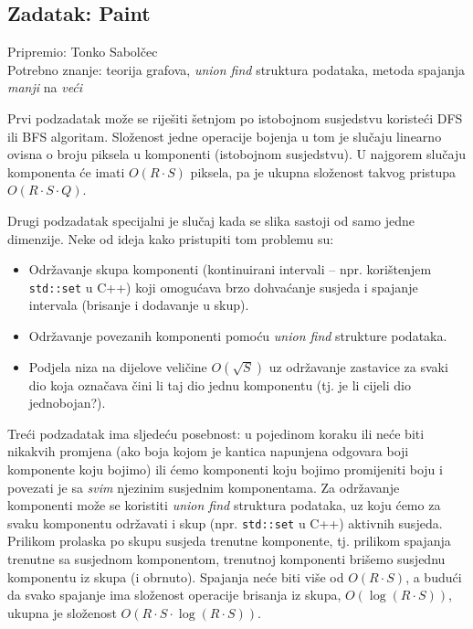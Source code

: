 \subsection*{Zadatak: Paint}
\textsf{Pripremio: Tonko Sabolčec}\\
\textsf{Potrebno znanje: teorija grafova, \textit{union find} struktura
podataka, metoda spajanja \textit{manji} na \textit{veći}}

Prvi podzadatak može se riješiti šetnjom po istobojnom susjedstvu koristeći DFS
ili BFS algoritam. Složenost jedne operacije bojenja u tom je slučaju linearno
ovisna o broju piksela u komponenti (istobojnom susjedstvu). U najgorem slučaju
komponenta će imati $O(R \cdot S)$ piksela, pa je ukupna složenost takvog
pristupa $O(R \cdot S \cdot Q)$.

Drugi podzadatak specijalni je slučaj kada se slika sastoji od samo jedne
dimenzije. Neke od ideja kako pristupiti tom problemu su:
\begin{itemize}[topsep=0pt]
  \item Održavanje skupa komponenti (kontinuirani intervali -- npr. korištenjem
    \verb|std::set| u C++) koji omogućava brzo dohvaćanje susjeda i spajanje
    intervala (brisanje i dodavanje u skup).
  \item Održavanje povezanih komponenti pomoću \textit{union find} strukture
    podataka.
  \item Podjela niza na dijelove veličine $O(\sqrt{S})$ uz održavanje
    zastavice za svaki dio koja označava čini li taj dio jednu komponentu
    (tj. je li cijeli dio jednobojan?).
\end{itemize}

Treći podzadatak ima sljedeću posebnost: u pojedinom koraku ili neće biti
nikakvih promjena (ako boja kojom je kantica napunjena odgovara boji komponente
koju bojimo) ili ćemo komponenti koju bojimo promijeniti boju i povezati je sa
\textit{svim} njezinim susjednim komponentama. Za održavanje komponenti može se
koristiti \textit{union find} struktura podataka, uz koju ćemo za svaku
komponentu održavati i skup (npr. \verb|std::set| u C++) aktivnih susjeda.
Prilikom prolaska po skupu susjeda trenutne komponente, tj. prilikom spajanja
trenutne sa susjednom komponentom, trenutnoj komponenti brišemo susjednu
komponentu iz skupa (i obrnuto).  Spajanja neće biti više od $O(R \cdot S)$, a
budući da svako spajanje ima složenost operacije brisanja iz skupa, $O(\log (R
\cdot S))$, ukupna je složenost $O(R \cdot S \cdot \log (R \cdot S))$.

